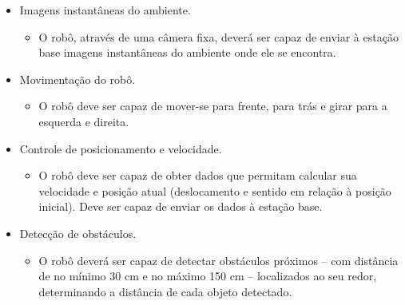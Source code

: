 \begin{itemize} %

  \item Imagens instantâneas do ambiente.
    \begin{itemize}
      \item O robô, através de uma câmera fixa, deverá ser capaz de enviar à estação base imagens instantâneas do ambiente onde ele se encontra.
    \end{itemize}

  \item Movimentação do robô.
    \begin{itemize}
      \item O robô deve ser capaz de mover-se para frente, para trás e girar para a esquerda e direita.
    \end{itemize}

  \item Controle de posicionamento e velocidade.
    \begin{itemize}
      \item O robô deve ser capaz de obter dados que permitam calcular sua velocidade e posição atual (deslocamento e sentido em relação à posição inicial). Deve ser capaz de enviar os dados à estação base.
    \end{itemize}

  \item Detecção de obstáculos.
    \begin{itemize}
      \item O robô deverá ser capaz de detectar obstáculos próximos -- com distância de no mínimo 30 cm e no máximo 150 cm -- localizados ao seu redor, determinando a distância de cada objeto detectado.
    \end{itemize}

\end{itemize} %


